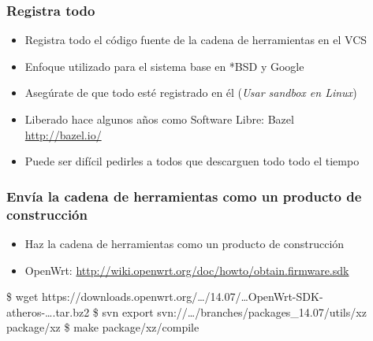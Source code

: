 \documentclass[14pt,aspectratio=169]{beamer}
\begin{document}
\begin{frame}
 \frametitle{Registra todo}

 \begin{itemize}
  \item Registra todo el código fuente de la cadena de herramientas en el VCS
  \item Enfoque utilizado para el sistema base en *BSD y Google
  \item Asegúrate de que todo esté registrado en él (\textit{Usar sandbox en Linux})
  \item Liberado hace algunos años como Software Libre: Bazel \\
   \url{http://bazel.io/}
  \item Puede ser difícil pedirles a todos que descarguen todo todo el tiempo
 \end{itemize}
\end{frame}

\begin{frame}[fragile]
 \frametitle{Envía la cadena de herramientas como un producto de construcción}

 \begin{itemize}
  \item Haz la cadena de herramientas como un producto de construcción
  \item OpenWrt:
    \url{http://wiki.openwrt.org/doc/howto/obtain.firmware.sdk}
 \end{itemize}

 \begin{example}\footnotesize
\begin{semiverbatim}
\$ wget https://downloads.openwrt.org/…/14.07/…OpenWrt-SDK-atheros-….tar.bz2
\$ svn export svn://…/branches/packages\_14.07/utils/xz package/xz
\$ make package/xz/compile
\end{semiverbatim}
 \end{example}

\end{frame}
\end{document}
